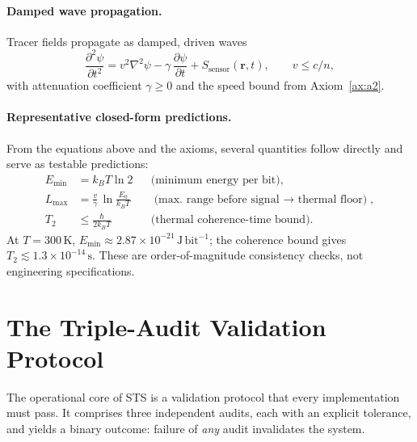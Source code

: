 \documentclass[11pt,a4paper]{article}
\begin{document}
\paragraph{Damped wave propagation.}
Tracer fields propagate as damped, driven waves
\begin{equation}
\frac{\partial^2 \psi}{\partial t^2}
= v^2 \nabla^2 \psi - \gamma\,\frac{\partial \psi}{\partial t}
+ S_\mathrm{sensor}(\bm{r},t),
\qquad v \le c/n,
\label{eq:wave}
\end{equation}
with attenuation coefficient $\gamma\ge 0$ and the speed bound from
Axiom~\ref{ax:a2}.

\paragraph{Representative closed-form predictions.}
From the equations above and the axioms, several quantities follow directly and
serve as testable predictions:
\begin{align}
E_\mathrm{min} &= k_B T \ln 2 &&\text{(minimum energy per bit)},\\
L_\mathrm{max} &= \frac{v}{\gamma}\,\ln\!\frac{E_0}{k_B T}
  &&\text{(max.\ range before signal $\to$ thermal floor)},\\
T_2 &\le \frac{\hbar}{2 k_B T} &&\text{(thermal coherence-time bound)}.
\end{align}
At $T=300\,\mathrm{K}$, $E_\mathrm{min}\approx 2.87\times10^{-21}\,\mathrm{J\,bit^{-1}}$;
the coherence bound gives $T_2 \lesssim 1.3\times10^{-14}\,\mathrm{s}$. These are
order-of-magnitude consistency checks, not engineering specifications.

\section{The Triple-Audit Validation Protocol}
\label{sec:audit}

The operational core of STS is a validation protocol that every implementation
must pass. It comprises three independent audits, each with an explicit tolerance,
and yields a binary outcome: failure of \emph{any} audit invalidates the system.
\end{document}
